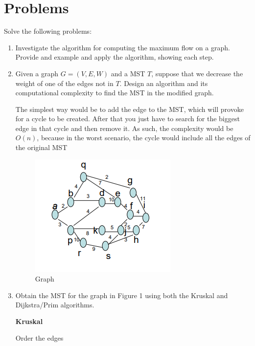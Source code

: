 \documentclass{article}
\begin{document}
\section{Problems}
Solve the following problems:
\begin{enumerate}
    \item Investigate the algorithm for computing the maximum flow on a graph. Provide and example and apply the algorithm, showing each step.


    \item Given a graph $G = (V, E, W)$ and a MST $T$, suppose that we decrease the weight of one of the edges not in $T$. Design an algorithm and its computational complexity to find the MST in the modified graph.

    The simplest way would be to add the edge to the MST, which will provoke for a cycle to be created. After that you just have to search for the biggest edge in that cycle and then remove it. As such, the complexity would be $O(n)$, because in the worst scenario, the cycle would include all the edges of the original MST

    \begin{figure}[ht]
        \centering
        \includegraphics{Hw8/P1.png}
        \caption{Graph}
        \label{graph}
    \end{figure}
    \item Obtain the MST for the graph in Figure 1 using both the Kruskal and Dijkstra/Prim algorithms.

    \textbf{Kruskal}

    Order the edges


\end{enumerate}
\end{document}
